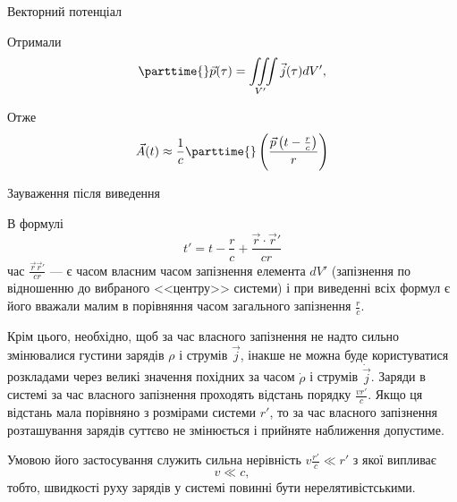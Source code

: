 \documentclass[onlytextwidth]{beamer}
\let\vect\vec
\begin{document}
\begin{frame}{Векторний потенціал}{}
\begin{onlyenv}
		\medskip

		Отримали
		\begin{equation*}
			\parttime{}\vect{p}(\tau) = \iiint\limits_{V'} {\vect{j}(\tau)} dV',
		\end{equation*}

		Отже
		\begin{equation*}
			\vect{A}(t) \approx \frac1{c}\parttime{}\left( \frac{\vect{p}\left(t - \frac{r}{c}\right)}{r} \right)
		\end{equation*}
	\end{onlyenv}

\end{frame}




\begin{frame}{Зауваження після виведення}{}\small
	\begin{block}{}
		В формулі
		\begin{equation*}
			t' =  t - \frac{r}{c} + \frac{\vect{r} \cdot \vect{r}'}{cr}
		\end{equation*}
		час $ \frac{\vect{r}\vect{r}'}{cr} $ --- є часом власним часом запізнення елемента $ dV' $ (запізнення по відношенню до вибраного <<центру>> системи) і при виведенні всіх формул є  його вважали малим в порівняння часом загального запізнення $ \frac{r}{c} $.
	\end{block}

	\begin{block}{}\justifying
		Крім цього, необхідно, щоб за час власного запізнення не надто сильно змінювалися густини зарядів $ \rho $ і струмів $ \vect{j} $, інакше не можна буде користуватися розкладами через великі значення похідних за часом $ \dot\rho $ і струмів $ \dot{\vect{j}} $. Заряди в системі за час власного запізнення проходять відстань порядку $ \frac{vr'}{c} $. Якщо ця відстань мала порівняно з розмірами системи $ r' $, то за час власного запізнення розташування зарядів суттєво не змінюється і прийняте наближення допустиме.
	\end{block}

	\begin{block}{}
		Умовою його застосування служить сильна нерівність $ v\frac{r'}{c} \ll r' $ з якої випливає
		\begin{equation*}
			v \ll c,
		\end{equation*}
		тобто, швидкості руху зарядів у системі повинні бути нерелятивістськими.
	\end{block}
\end{frame}
\end{document}
